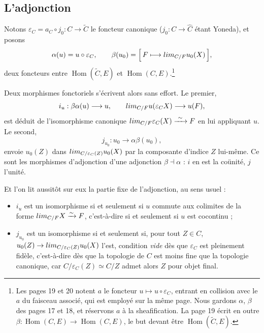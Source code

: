 \documentclass[11pt,a4paper]{article}
\begin{document}
\subsection*{L'adjonction}

Notons $\varepsilon_{C} = a_{C} \circ j_{0} : C \to \widetilde{C}$ le foncteur
canonique ($j_{0} : C \to \widehat{C}$ étant Yoneda), et posons
\[
\alpha(u) = u \circ \varepsilon_{C}, \qquad
\beta(u_{0}) = \Bigl[\, F \longmapsto \varinjlim_{C/F} u_{0}(X) \,\Bigr],
\]
deux foncteurs entre $\operatorname{Hom}(\widetilde{C}, E)$ et
$\operatorname{Hom}(C, E)$.\footnote{Les pages 19 et 20 notent $a$ le foncteur
$u \mapsto u \circ \varepsilon_{C}$, entrant en collision avec le $a$ du
faisceau associé, qui est employé sur la même page. Nous gardons $\alpha$,
$\beta$ des pages 17 et 18, et réservons $a$ à la sheafification. La page 19
écrit en outre $\beta : \operatorname{Hom}(C,E) \to \operatorname{Hom}(C,E)$,
le but devant être $\operatorname{Hom}(\widetilde{C},E)$.}

Deux morphismes fonctoriels s'écrivent alors sans effort. Le premier,
\[
i_{u} : \beta\alpha(u) \longrightarrow u,
\qquad
\varinjlim_{C/F} u(\varepsilon_{C}X) \longrightarrow u(F),
\]
est déduit de l'isomorphisme canonique
$\varinjlim_{C/F} \varepsilon_{C}(X) \xrightarrow{\ \sim\ } F$ en lui
appliquant $u$. Le second,
\[
j_{u_{0}} : u_{0} \longrightarrow \alpha\beta(u_{0}),
\]
envoie $u_{0}(Z)$ dans $\varinjlim_{C/\varepsilon_{C}(Z)} u_{0}(X)$ par la
composante d'indice $Z$ lui-même. Ce sont les morphismes d'adjonction d'une
adjonction $\beta \dashv \alpha$ : $i$ en est la coünité, $j$ l'unité.

Et l'on lit aussitôt sur eux la partie fixe de l'adjonction, au sens usuel :

\begin{itemize}
\item $i_{u}$ est un isomorphisme si et seulement si $u$ commute aux colimites
de la forme $\varinjlim_{C/F} X \xrightarrow{\sim} F$, c'est-à-dire si et
seulement si $u$ est cocontinu ;
\item $j_{u_{0}}$ est un isomorphisme si et seulement si, pour tout
$Z \in C$, $u_{0}(Z) \to \varinjlim_{C/\varepsilon_{C}(Z)} u_{0}(X)$ l'est,
condition \emph{vide} dès que $\varepsilon_{C}$ est pleinement fidèle,
c'est-à-dire dès que la topologie de $C$ est moins fine que la topologie
canonique, car $C/\varepsilon_{C}(Z) \simeq C/Z$ admet alors $Z$ pour objet
final.
\end{itemize}
\end{document}
